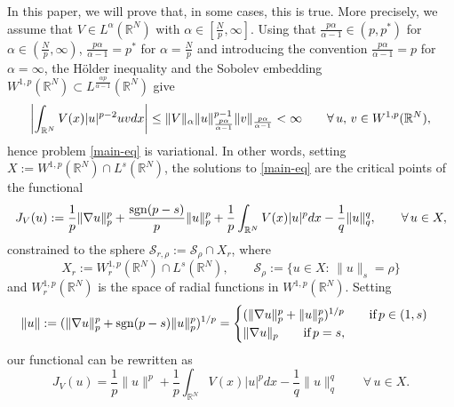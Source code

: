 \documentclass[11pt,reqno]{amsart}
\theoremstyle{definition}
\numberwithin{equation}{section}
\numberwithin{theorem}{section}
\numberwithin{equation}{section}
\numberwithin{theorem}{section}
\newcommand{\R}{\mathbb{R}}
\begin{document}
In this paper, we will prove that, in some cases, this is true. More precisely, we assume that $V\in L^\alpha(\R^N)$ with $\alpha\in[\frac{N}{p},\infty]$. Using that $\frac{p\alpha}{\alpha-1}\in(p,p^*)$ for $\alpha\in(\frac{N}{p},\infty)$, $\frac{p\alpha}{\alpha-1}=p^*$ for $\alpha=\frac{N}{p}$ and introducing the convention $\frac{p\alpha}{\alpha-1}=p$ for $\alpha=\infty$, the H\"{o}lder inequality and the Sobolev embedding $W^{1,p}(\R^N)\subset L^{\frac{\alpha p}{\alpha-1}}(\R^N)$ give
\begin{equation}\notag
\left|\int_{\R^N} V(x)|u|^{p-2} uv dx\right|\le \|V\|_\alpha\|u\|_{\frac{p\alpha}{\alpha-1}}^{p-1}\|v\|_{\frac{p\alpha}{\alpha-1}}<\infty\qquad\forall\,u,\,v\in W^{1,p}(\R^N), 
\end{equation}
hence problem \eqref{main-eq} is variational. In other words, setting $X:=W^{1,p}(\R^N)\cap L^s(\R^N)$, the solutions to \eqref{main-eq} are the critical points of the functional
\begin{equation}
J_V(u):=\frac{1}{p}\|\nabla u\|_p^p+\frac{{\rm sgn}(p-s)}{p}\|u\|^p_p+\frac{1}{p}\int_{\R^N} V(x)|u|^p dx-\frac{1}{q}\|u\|_q^q,\qquad\forall\, u\in X,
\end{equation}
constrained to the sphere $\mathcal{S}_{r,\rho}:=\mathcal{S}_\rho\cap X_r$, where $$X_r:=W^{1,p}_r(\R^N)\cap L^s(\R^N),\qquad\mathcal{S}_{\rho}:=\{u\in X:\,\|u\|_s=\rho\}$$
and $W^{1,p}_r(\R^N)$ is the space of radial functions in $W^{1,p}(\R^N)$. Setting 
$$\|u\|:=(\|\nabla u\|_p^p+{\rm sgn}(p-s)\|u\|_p^p)^{1/p}=\begin{cases}
    (\|\nabla u\|_p^p+\|u\|_p^p)^{1/p}\qquad\text{if}\,p\in(1,s)\\
    \|\nabla u\|_p\qquad\text{if}\,p=s,
\end{cases}
$$
our functional can be rewritten as
$$J_V(u)=\frac{1}{p}\|u\|^p+\frac{1}{p}\int_{\R^N} V(x)|u|^p dx-\frac{1}{q}\|u\|_q^q\qquad\forall\, u\in X.$$
\end{document}

